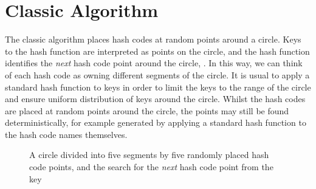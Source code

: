\documentclass[runningheads,a4paper]{llncs}
\newcommand{\slice}[3]{

  \draw (0,0) -- (#1:1) arc (#1:#2:1);
  \draw (0,0) -- (#1:1.1);

  \node at (#1:1.3) {#3};
}
\begin{document}
\section{Classic Algorithm}

The classic algorithm places hash codes at random points around a
circle. Keys to the hash function are interpreted as points on the
circle, and the hash function identifies the {\em next} hash code
point around the circle, . In this way, we can
think of each hash code as owning different segments of the circle. It
is usual to apply a standard hash function to keys in order to limit
the keys to the range of the circle and ensure uniform distribution of
keys around the circle. Whilst the hash codes are placed at random
points around the circle, the points may still be found
deterministically, for example generated by applying a standard hash
function to the hash code names themselves.

\begin{figure}
\begin{center}
\end{center}
\caption{A circle divided into five segments by five randomly placed
  hash code points, and the search for the {\em next} hash code point
  from the key }
\label{fig:circle-simple}
\end{figure}
\end{document}
